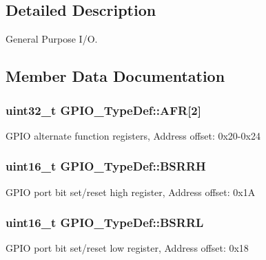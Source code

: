 \subsection{Detailed Description}
General Purpose I/O. 

\subsection{Member Data Documentation}
\subsubsection[{\texorpdfstring{A\+FR}{AFR}}]{ uint32\+\_\+t G\+P\+I\+O\+\_\+\+Type\+Def\+::\+A\+FR\mbox{[}2\mbox{]}}\hypertarget{struct_g_p_i_o___type_def_a2245603433e102f0fd8a85f7de020755}{}\label{struct_g_p_i_o___type_def_a2245603433e102f0fd8a85f7de020755}
G\+P\+IO alternate function registers, Address offset\+: 0x20-\/0x24 
\subsubsection[{\texorpdfstring{B\+S\+R\+RH}{BSRRH}}]{ uint16\+\_\+t G\+P\+I\+O\+\_\+\+Type\+Def\+::\+B\+S\+R\+RH}\hypertarget{struct_g_p_i_o___type_def_ad4b5f8bc936e26e3980686d2aba9d882}{}\label{struct_g_p_i_o___type_def_ad4b5f8bc936e26e3980686d2aba9d882}
G\+P\+IO port bit set/reset high register, Address offset\+: 0x1A 
\subsubsection[{\texorpdfstring{B\+S\+R\+RL}{BSRRL}}]{ uint16\+\_\+t G\+P\+I\+O\+\_\+\+Type\+Def\+::\+B\+S\+R\+RL}\hypertarget{struct_g_p_i_o___type_def_ad2528bbb921532be8116534651b1faee}{}\label{struct_g_p_i_o___type_def_ad2528bbb921532be8116534651b1faee}
G\+P\+IO port bit set/reset low register, Address offset\+: 0x18 
